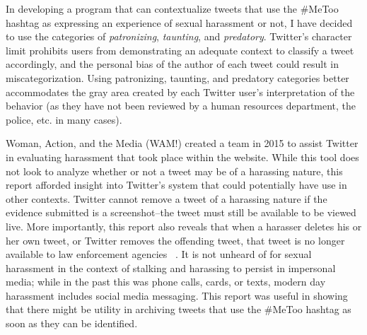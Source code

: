 In developing a program that can contextualize tweets that use the \#MeToo hashtag as expressing an experience of sexual harassment or not, I have decided to use the categories of \textit{patronizing}, \textit{taunting}, and \textit{predatory}. Twitter's character limit prohibits users from demonstrating an adequate context to classify a tweet accordingly, and the personal bias of the author of each tweet could result in miscategorization. Using patronizing, taunting, and predatory categories better accommodates the gray area created by each Twitter user's interpretation of the behavior (as they have not been reviewed by a human resources department, the police, etc. in many cases).

Woman, Action, and the Media (WAM!) created a team in 2015 to assist Twitter in evaluating harassment that took place within the website. While this tool does not look to analyze whether or not a tweet may be of a harassing nature, this report afforded insight into Twitter's system that could potentially have use in other contexts. Twitter cannot remove a tweet of a harassing nature if the evidence submitted is a screenshot--the tweet must still be available to be viewed live. More importantly, this report also reveals that when a harasser deletes his or her own tweet, or Twitter removes the offending tweet, that tweet is no longer available to law enforcement agencies ~\cite{matias2015reporting}. It is not unheard of for sexual harassment in the context of stalking and harassing to persist in impersonal media; while in the past this was phone calls, cards, or texts, modern day harassment includes social media messaging. This report was useful in showing that there might be utility in archiving tweets that use the \#MeToo hashtag as soon as they can be identified. 
